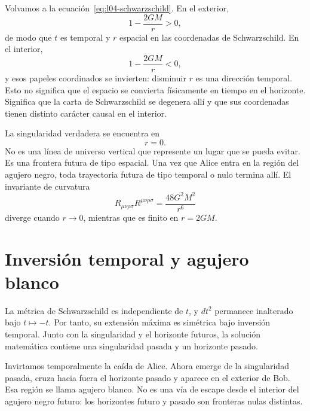 Volvamos a la ecuación~\eqref{eq:l04-schwarzschild}. En el exterior,
\begin{equation}
1-\frac{2GM}{r}>0,
\end{equation}
de modo que \(t\) es temporal y \(r\) espacial en las coordenadas de Schwarzschild. En el interior,
\begin{equation}
1-\frac{2GM}{r}<0,
\end{equation}
y esos papeles coordinados se invierten: disminuir \(r\) es una dirección temporal. Esto no significa que el espacio se convierta físicamente en tiempo en el horizonte. Significa que la carta de Schwarzschild se degenera allí y que sus coordenadas tienen distinto carácter causal en el interior.

La singularidad verdadera se encuentra en
\begin{equation}
r=0.
\end{equation}
No es una línea de universo vertical que represente un lugar que se pueda evitar. Es una frontera futura de tipo espacial. Una vez que Alice entra en la región del agujero negro, toda trayectoria futura de tipo temporal o nulo termina allí. El invariante de curvatura
\begin{equation}
R_{\mu\nu\rho\sigma}R^{\mu\nu\rho\sigma}
=\frac{48G^2M^2}{r^6}
\label{eq:l04-kretschmann}
\end{equation}
diverge cuando \(r\to0\), mientras que es finito en \(r=2GM\).

\section{Inversión temporal y agujero blanco}

La métrica de Schwarzschild es independiente de \(t\), y \(dt^2\) permanece inalterado bajo \(t\mapsto-t\). Por tanto, su extensión máxima es simétrica bajo inversión temporal. Junto con la singularidad y el horizonte futuros, la solución matemática contiene una singularidad pasada y un horizonte pasado.

Invirtamos temporalmente la caída de Alice. Ahora emerge de la singularidad pasada, cruza hacia fuera el horizonte pasado y aparece en el exterior de Bob. Esa región se llama agujero blanco. No es una vía de escape desde el interior del agujero negro futuro: los horizontes futuro y pasado son fronteras nulas distintas.

